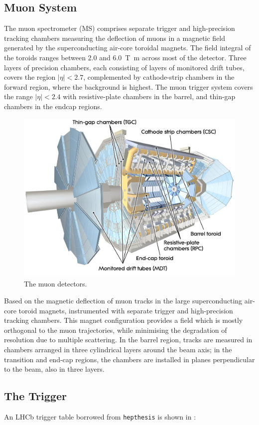 \subsection{Muon System}

The muon spectrometer (MS) comprises separate trigger and
high-precision tracking chambers measuring the deflection of muons in a magnetic field generated by the superconducting air-core toroidal magnets.
The field integral of the toroids ranges between \num{2.0} and \SI{6.0}{\tesla\metre}
across most of the detector. 
Three layers of precision chambers, each consisting of layers of monitored drift tubes, covers the region \(|\eta| < 2.7\),
complemented by cathode-strip chambers in the forward region, where the background is highest.
The muon trigger system covers the range \(|\eta| < 2.4\) with resistive-plate chambers in the barrel, and thin-gap chambers in the endcap regions.



%
\begin{figure}[!htpb]
  \centering
  \includegraphics[width=0.4\linewidth]{chapters/2.detector/figs/atlas_muon_system.jpg}
  \caption{The \ATLAS muon detectors.}
  \label{fig:atlas_muon_system}
\end{figure}
%


Based on the magnetic deflection of muon tracks in the large superconducting air-core toroid magnets, instrumented with separate trigger and high-precision tracking chambers. This magnet configuration provides a field which is mostly orthogonal to the muon trajectories, while minimising the degradation of resolution due to multiple scattering. In the barrel region, tracks are measured in chambers arranged in three cylindrical layers around the beam axis; in the transition and end-cap regions, the chambers are installed in planes perpendicular to the beam, also in three layers.



\subsection{The Trigger}
\label{sec:bg-theory:triggers}
An LHCb trigger table borrowed from \texttt{hepthesis} is shown in :

